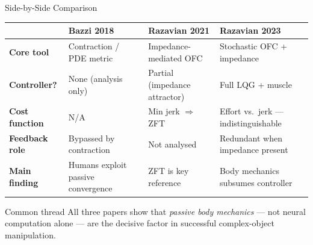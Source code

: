 \documentclass[aspectratio=169,10pt]{beamer}
\begin{document}
\begin{frame}{Side-by-Side Comparison}
\begin{center}
\small
\begin{tabular}{@{}lp{3.0cm}p{3.0cm}p{3.2cm}@{}}
\toprule
 & \textbf{Bazzi 2018} & \textbf{Razavian 2021} & \textbf{Razavian 2023} \\
\midrule
\textbf{Core tool}       & Contraction / PDE metric & Impedance-mediated OFC & Stochastic OFC + impedance \\
\textbf{Controller?}     & None (analysis only)     & Partial (impedance attractor) & Full LQG + muscle \\
\textbf{Cost function}   & N/A                     & Min jerk $\Rightarrow$ ZFT   & Effort vs.\ jerk --- indistinguishable \\
\textbf{Feedback role}   & Bypassed by contraction  & Not analysed            & Redundant when impedance present \\
\textbf{Main finding}    & Humans exploit passive convergence & ZFT is key reference & Body mechanics subsumes controller \\
\bottomrule
\end{tabular}
\end{center}

\vspace{6pt}
\begin{block}{Common thread}
  All three papers show that \emph{passive body mechanics} --- not neural
  computation alone --- are the decisive factor in successful
  complex-object manipulation.
\end{block}
\end{frame}
\end{document}
